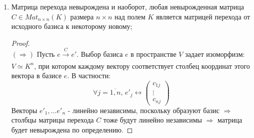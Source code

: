 \documentclass[12pt]{article}
\theoremstyle{definition}
\newcommand{\mat}[2]{Mat_{#1\times #2}}
\begin{document}
\begin{enumerate}[label=\arabic*)]
	\item Матрица перехода невырождена и наоборот, любая невырожденная матрица $C \in \mat{n}{n}(K)$ размера $n \times n$ над полем $K$ является матрицей перехода от исходного базиса к некоторому новому;
	\begin{proof}\hfill\\
		$(\Rightarrow)$ Пусть $e \xrightarrow[]{C} e'$. Выбор базиса $e$ в пространстве $V$ задает изоморфизм: $V \simeq K^n$, при котором каждому вектору соответствует столбец координат этого вектора в базисе $e$. В частности:
		$$
			\forall j = \overline{1, n}, \, e'_j \longleftrightarrow 
			\begin{pmatrix}
				c_{1j}\\
				\vdots \\
				c_{nj}
			\end{pmatrix}
		$$
		Векторы $e'_1, \dotsc e'_n$ - линейно независимы, поскольку образуют базис $\Rightarrow$ столбцы матрицы перехода $C$ тоже будут линейно независимы $\Rightarrow$ матрица будет невырождена по определению.
		

\end{proof}
\end{enumerate}
\end{document}
